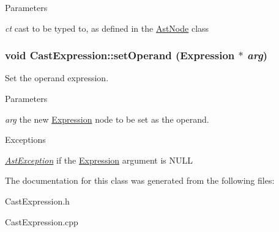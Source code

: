 \begin{DoxyParams}{Parameters}
\item[{\em ct}]cast to be typed to, as defined in the \hyperlink{classAstNode}{AstNode} class \end{DoxyParams}
\hypertarget{classCastExpression_ac24a64d42327406feeee20ef0b641c6b}{
\subsubsection[{setOperand}]{\setlength{\rightskip}{0pt plus 5cm}void CastExpression::setOperand ({\bf Expression} $\ast$ {\em arg})}}
\label{classCastExpression_ac24a64d42327406feeee20ef0b641c6b}
Set the operand expression.


\begin{DoxyParams}{Parameters}
\item[{\em arg}]the new \hyperlink{classExpression}{Expression} node to be set as the operand. \end{DoxyParams}

\begin{DoxyExceptions}{Exceptions}
\item[{\em \hyperlink{classAstException}{AstException}}]if the \hyperlink{classExpression}{Expression} argument is NULL \end{DoxyExceptions}


The documentation for this class was generated from the following files:\begin{DoxyCompactItemize}
\item 
CastExpression.h\item 
CastExpression.cpp\end{DoxyCompactItemize}
